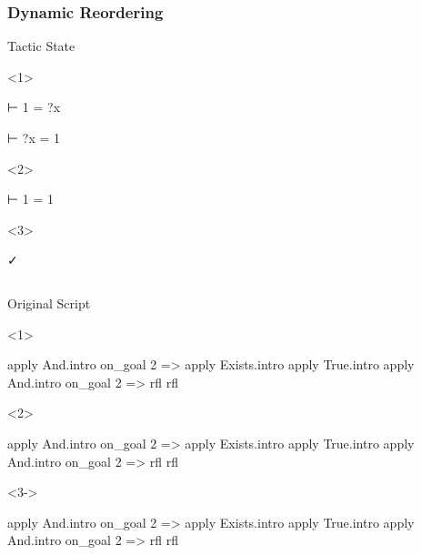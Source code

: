 \begin{frame}[fragile]
  \frametitle{Dynamic Reordering}

  \begin{block}{Tactic State}
    \begin{onlyenv}<1>
      \begin{leancode}
        ⊢ 1 = ?x

        ⊢ ?x = 1
      \end{leancode}
    \end{onlyenv}
    \begin{onlyenv}<2>
      \begin{leancode}
        ⊢ 1 = 1


      \end{leancode}
    \end{onlyenv}
    \begin{onlyenv}<3>
      \begin{leancode}
        ✓


      \end{leancode}
    \end{onlyenv}
  \end{block}

  \begin{columns}[onlytextwidth,t]
    \begin{column}{.6\textwidth}
      \begin{block}{Original Script}
        \begin{onlyenv}<1>
          \begin{leancode}
            apply And.intro
            on_goal 2 => apply Exists.intro
            apply True.intro
            apply And.intro
            on_goal 2 => rfl
            rfl
          \end{leancode}
        \end{onlyenv}
        \begin{onlyenv}<2>
          \begin{leancode}[highlightlines=6]
            apply And.intro
            on_goal 2 => apply Exists.intro
            apply True.intro
            apply And.intro
            on_goal 2 => rfl
            rfl
          \end{leancode}
        \end{onlyenv}
        \begin{onlyenv}<3->
          \begin{leancode}[highlightlines=5]
            apply And.intro
            on_goal 2 => apply Exists.intro
            apply True.intro
            apply And.intro
            on_goal 2 => rfl
            rfl
          \end{leancode}
        \end{onlyenv}
      \end{block}
    \end{column}


\end{columns}
\end{frame}
